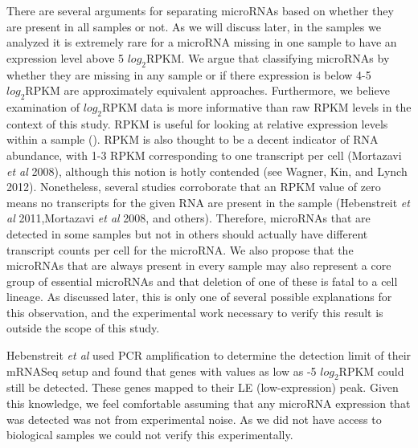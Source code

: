 \documentclass[12pt]{report}
\begin{document}

  There are several arguments for separating microRNAs based on whether they are present in all samples or not. As we will discuss later, in the samples we analyzed it is extremely rare
  for a microRNA missing in one sample to have an expression level above 5 $log_{2} \text{RPKM}$. We argue that classifying microRNAs by whether they are missing in any sample or if there expression
  is below 4-5 $log_{2} \text{RPKM}$ are approximately equivalent approaches. Furthermore, we believe examination of $log_{2} \text{RPKM}$ data is more informative than raw RPKM levels in the context
  of this study. RPKM is useful for looking at relative expression levels within a sample (). RPKM is also thought to be a decent indicator of RNA abundance, with 1-3 RPKM corresponding to one transcript
  per cell (Mortazavi \textit{et al} 2008), although this notion is hotly contended (see Wagner, Kin, and Lynch 2012). Nonetheless, several studies corroborate that an RPKM value of zero
  means no transcripts for the given RNA are present in the sample (Hebenstreit \textit{et al} 2011,Mortazavi \textit{et al} 2008, and others). Therefore, microRNAs that are detected in some samples but not
  in others should actually have different transcript counts per cell for the microRNA. We also propose that the microRNAs that are always present in every sample may also represent a core group of essential
  microRNAs and that deletion of one of these is fatal to a cell lineage. As discussed later, this is only one of several possible explanations for this observation, and the experimental work necessary
  to verify this result is outside the scope of this study. %
  
  
  Hebenstreit \textit{et al} used PCR amplification to determine the detection limit of their mRNASeq setup and found that
  genes with values as low as -5 $log_{2} \text{RPKM}$ could still be detected. These genes mapped to their LE (low-expression) peak. Given this knowledge, we feel comfortable assuming that any microRNA expression that was detected
  was not from experimental noise. As we did not have access to biological samples we could not verify this experimentally.
  
\end{document}
